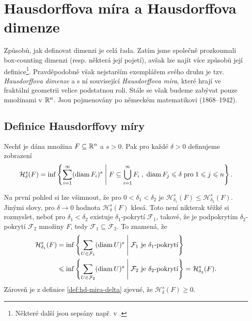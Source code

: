 \section{Hausdorffova míra a Hausdorffova dimenze}\label{sec:hausdorffova-mira-dimenze}

Způsobů, jak definovat dimenzi je celá řada. Zatím jsme společně prozkoumali box-counting dimenzi (resp. některá její pojetí), avšak lze najít více způsobů její definice\footnote{Některé další jsou sepsány např. v \citep[str. 40]{Falconer2014}.}. Pravděpodobně však nejstarším exemplářem svého druhu je tzv. \emph{Hausdorffova dimenze} a s ní související \emph{Hausdorffova míra}, které hrají ve fraktální geometrii velice podstatnou roli. Stále se však budeme zabývat pouze množinami v $\mathbb{R}^n$. Jsou pojmenovány po německém matematikovi  (1868--1942).

\subsection{Definice Hausdorffovy míry}\label{subsec:hd-mira-definice}

\begin{definition}\label{def:hd-mira-delta}
    Nechť je dána množina $F\subseteq\mathbb{R}^n$ a $s>0$. Pak pro každé $\delta>0$ definujeme zobrazení
    \[\mathcal{H}_\delta^s(F)=\inf\left\{\sum_{i=1}^{\infty}(\operatorname{diam}{F_i})^s\;\middle|\;F\subseteq\bigcup_{i=1}^\infty F_i\;,\;\operatorname{diam}{F_j}\leqslant\delta\;\text{pro}\;1\leqslant j\leqslant n\right\}.\]
\end{definition}
Na první pohled si lze všimnout, že pro $0<\delta_1<\delta_2$ je $\mathcal{H}_{\delta_1}^s(F)\leqslant\mathcal{H}_{\delta_2}^s(F)$. Jinými slovy, pro $\delta\to 0$ hodnota $\mathcal{H}_\delta^s(F)$ klesá. Toto není nikterak těžké si rozmyslet, neboť pro $\delta_1<\delta_2$ existuje $\delta_1$-pokrytí $\mathcal{F}_1$, takové, že je podpokrytím $\delta_2$-pokrytí $\mathcal{F}_2$ množiny $F$, tedy $\mathcal{F}_1\subseteq\mathcal{F}_2$. To znamená, že
\begin{align*}
    \mathcal{H}_{\delta_1}^s(F)&=\inf\left\{\sum_{U\in\mathcal{F}_1}(\operatorname{diam}{U})^s\;\middle|\;\text{$\mathcal{F}_1$ je $\delta_1$-pokrytí}\right\}\\
    &\leqslant\inf\left\{\sum_{U\in\mathcal{F}_2}(\operatorname{diam}{U})^s\;\middle|\;\text{$\mathcal{F}_2$ je $\delta_2$-pokrytí}\right\}=\mathcal{H}_{\delta_2}^s(F).
\end{align*}
Zároveň je z definice \ref{def:hd-mira-delta} zjevné, že $\mathcal{H}_\delta^s(F)\geqslant 0$.

